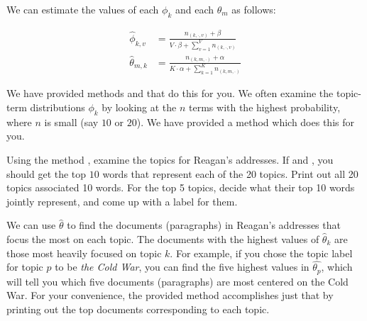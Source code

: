 We can estimate the values of each $\phi_{k}$ and each $\theta_{m}$ as follows:

\begin{align*}
    \widehat{\phi}_{k,v} & = \frac{n_{(k,\cdot,v)} + \beta}{V \cdot \beta + \sum_{v=1}^{V} n_{(k,\cdot,v)}} \\
    \widehat{\theta}_{m,k} & = \frac{n_{(k,m,\cdot)} + \alpha}{K \cdot \alpha + \sum_{k=1}^{K} n_{(k,m,\cdot)}}
\end{align*}

We have provided methods  and  that do this for you. We often examine the topic-term distributions $\phi_{k}$ by looking at the $n$ terms with the highest probability, where $n$ is small (say $10$ or $20$).
We have provided a method  which does this for you.

\begin{problem}
Using the method , examine the topics for Reagan's addresses.
If  and , you should get the top $10$ words that represent each of the 20 topics.
Print out all 20 topics associated 10 words.
For the top 5 topics, decide what their top 10 words jointly represent, and come up with a label for them.
\end{problem}

We can use $\widehat{\theta}$ to find the documents (paragraphs) in Reagan's addresses that focus the most on each topic. The documents with the highest values of $\widehat{\theta}_{k}$ are those most heavily focused on topic $k$.
For example, if you chose the topic label for topic $p$ to be \emph{the Cold War}, you can find the five highest values in $\widehat{\theta_{p}}$, which will tell you which five documents (paragraphs) are most centered on the Cold War.
For your convenience, the provided method  accomplishes just that by printing out the top  documents corresponding to each topic.

